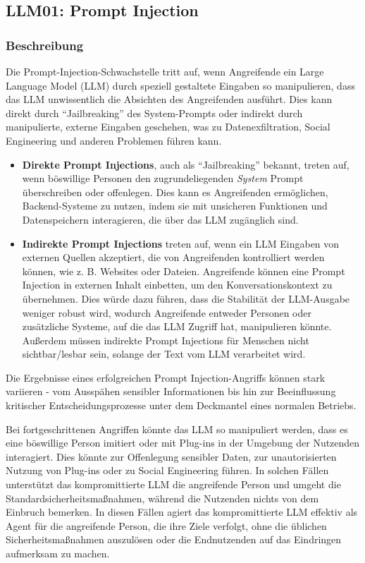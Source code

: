 \documentclass[
]{article}
\author{}
\date{}
\providecommand{\tightlist}{%
  \setlength{\itemsep}{0pt}\setlength{\parskip}{0pt}}
\begin{document}
\subsection{LLM01: Prompt Injection}\label{llm01-prompt-injection}

\subsubsection{Beschreibung}\label{beschreibung}

Die Prompt-Injection-Schwachstelle tritt auf, wenn Angreifende ein Large
Language Model (LLM) durch speziell gestaltete Eingaben so manipulieren,
dass das LLM unwissentlich die Absichten des Angreifenden ausführt. Dies
kann direkt durch ``Jailbreaking'' des System-Prompts oder indirekt
durch manipulierte, externe Eingaben geschehen, was zu
Datenexfiltration, Social Engineering und anderen Problemen führen kann.

\begin{itemize}
\tightlist
\item
  \textbf{Direkte Prompt Injections}, auch als ``Jailbreaking'' bekannt,
  treten auf, wenn böswillige Personen den zugrundeliegenden
  \emph{System} Prompt überschreiben oder offenlegen. Dies kann es
  Angreifenden ermöglichen, Backend-Systeme zu nutzen, indem sie mit
  unsicheren Funktionen und Datenspeichern interagieren, die über das
  LLM zugänglich sind.
\item
  \textbf{Indirekte Prompt Injections} treten auf, wenn ein LLM Eingaben
  von externen Quellen akzeptiert, die von Angreifenden kontrolliert
  werden können, wie z. B. Websites oder Dateien. Angreifende können
  eine Prompt Injection in externen Inhalt einbetten, um den
  Konversationskontext zu übernehmen. Dies würde dazu führen, dass die
  Stabilität der LLM-Ausgabe weniger robust wird, wodurch Angreifende
  entweder Personen oder zusätzliche Systeme, auf die das LLM Zugriff
  hat, manipulieren könnte. Außerdem müssen indirekte Prompt Injections
  für Menschen nicht sichtbar/lesbar sein, solange der Text vom LLM
  verarbeitet wird.
\end{itemize}

Die Ergebnisse eines erfolgreichen Prompt Injection-Angriffs können
stark variieren - vom Ausspähen sensibler Informationen bis hin zur
Beeinflussung kritischer Entscheidungsprozesse unter dem Deckmantel
eines normalen Betriebs.

Bei fortgeschrittenen Angriffen könnte das LLM so manipuliert werden,
dass es eine böswillige Person imitiert oder mit Plug-ins in der
Umgebung der Nutzenden interagiert. Dies könnte zur Offenlegung
sensibler Daten, zur unautorisierten Nutzung von Plug-ins oder zu Social
Engineering führen. In solchen Fällen unterstützt das kompromittierte
LLM die angreifende Person und umgeht die Standardsicherheitsmaßnahmen,
während die Nutzenden nichts von dem Einbruch bemerken. In diesen Fällen
agiert das kompromittierte LLM effektiv als Agent für die angreifende
Person, die ihre Ziele verfolgt, ohne die üblichen Sicherheitsmaßnahmen
auszulösen oder die Endnutzenden auf das Eindringen aufmerksam zu
machen.
\end{document}
